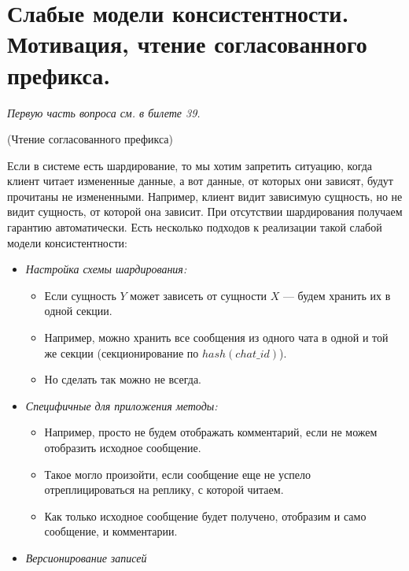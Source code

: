 \section{Слабые модели консистентности. Мотивация, чтение согласованного префикса.}

\textit{Первую часть вопроса см. в билете 39.}

\begin{example}(Чтение согласованного префикса)

Если в системе есть шардирование, то мы хотим запретить ситуацию, когда клиент читает измененные данные, а вот данные, от которых они зависят, будут прочитаны не измененными. Например, клиент видит зависимую сущность, но не видит сущность, от которой она зависит. При отсутствии шардирования получаем гарантию автоматически. Есть несколько подходов к реализации такой слабой модели консистентности:

\begin{itemize}
    \item \textit{Настройка схемы шардирования:}
    \begin{itemize}
        \item Если сущность $Y$ может зависеть от сущности $X$ --- будем хранить их в одной секции.
        \item Например, можно хранить все сообщения из одного чата в одной и той же секции (секционирование по $hash(chat\_id)$).
        \item Но сделать так можно не всегда.
    \end{itemize}

    \item \textit{Специфичные для приложения методы:}
    \begin{itemize}
        \item Например, просто не будем отображать комментарий, если не можем отобразить исходное сообщение.
        \item Такое могло произойти, если сообщение еще не успело отреплицироваться на реплику, с которой читаем.
        \item Как только исходное сообщение будет получено, отобразим и само сообщение, и комментарии.
    \end{itemize}

    \item \textit{Версионирование записей}

\end{itemize}

\end{example}

